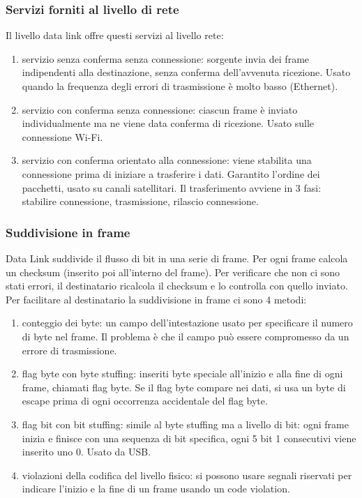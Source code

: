 \documentclass{article}
\begin{document}
\subsubsection{Servizi forniti al livello di rete}
Il livello data link offre questi servizi al livello rete:
\begin{enumerate}
\item servizio senza conferma senza connessione: sorgente invia dei frame indipendenti alla destinazione, senza conferma dell'avvenuta ricezione. Usato quando la frequenza degli errori di trasmissione è molto basso (Ethernet).
\item servizio con conferma senza connessione: ciascun frame è inviato individualmente ma ne viene data conferma di ricezione. Usato sulle connessione Wi-Fi.  
\item servizio con conferma orientato alla connessione: viene stabilita una connessione prima di iniziare a trasferire i dati. Garantito l'ordine dei pacchetti, usato su canali satellitari. Il trasferimento avviene in 3 fasi: stabilire connessione, trasmissione, rilascio connessione.
\end{enumerate}
\subsubsection{Suddivisione in frame} 
Data Link suddivide il flusso di bit in una serie di frame. Per ogni frame calcola un checksum (inserito poi all'interno del frame). Per verificare che non ci sono stati errori, il destinatario ricalcola il checksum e lo controlla con quello inviato.
Per facilitare al destinatario la suddivisione in frame ci sono 4 metodi:
\begin{enumerate}
\item conteggio dei byte: un campo dell'intestazione usato per specificare il numero di byte nel frame. Il problema è che il campo può essere compromesso da un errore di trasmissione.
\item flag byte con byte stuffing: inseriti byte speciale all'inizio e alla fine di ogni frame, chiamati flag byte. Se il flag byte compare nei dati, si usa un byte di escape prima di ogni occorrenza accidentale del flag byte. 
\item flag bit con bit stuffing: simile al byte stuffing ma a livello di bit: ogni frame inizia e finisce con una sequenza di bit specifica, ogni 5 bit 1 consecutivi viene inserito uno 0. Usato da USB.
\item violazioni della codifica del livello fisico: si possono usare segnali riservati per indicare l'inizio e la fine di un frame usando un code violation.

\end{enumerate}
\end{document}
